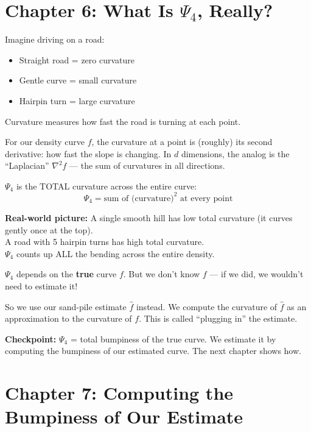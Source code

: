 \documentclass[12pt]{article}
\newcommand{\concept}[2]{\begin{tcolorbox}[colback=blue!3,colframe=blue!40!black,title={#1},breakable]#2\end{tcolorbox}}
\newcommand{\realworld}[1]{\begin{tcolorbox}[colback=green!5,colframe=green!50!black,breakable]\textbf{Real-world picture:} #1\end{tcolorbox}}
\newcommand{\checkpoint}[1]{\begin{tcolorbox}[colback=purple!5,colframe=purple!50!black,breakable]\textbf{Checkpoint:} #1\end{tcolorbox}}
\begin{document}
\section{Chapter 6: What Is $\Psi_4$, Really?}

\concept{Curvature: how much a curve bends}{
Imagine driving on a road:
\begin{itemize}
\item Straight road = zero curvature
\item Gentle curve = small curvature
\item Hairpin turn = large curvature
\end{itemize}

Curvature measures how fast the road is turning at each point.
}

For our density curve $f$, the curvature at a point is (roughly) its second derivative: how fast the slope is changing. In $d$ dimensions, the analog is the ``Laplacian'' $\nabla^2 f$ --- the sum of curvatures in all directions.

$\Psi_4$ is the TOTAL curvature across the entire curve:
$$\Psi_4 = \text{sum of (curvature)}^2 \text{ at every point}$$

\realworld{
A single smooth hill has low total curvature (it curves gently once at the top).\\
A road with 5 hairpin turns has high total curvature.\\
$\Psi_4$ counts up ALL the bending across the entire density.
}

\concept{Why we can't just calculate it}{
$\Psi_4$ depends on the \textbf{true} curve $f$. But we don't know $f$ --- if we did, we wouldn't need to estimate it! 

So we use our sand-pile estimate $\hat{f}$ instead. We compute the curvature of $\hat{f}$ as an approximation to the curvature of $f$. This is called ``plugging in'' the estimate.
}

\checkpoint{$\Psi_4$ = total bumpiness of the true curve. We estimate it by computing the bumpiness of our estimated curve. The next chapter shows how.}

\section{Chapter 7: Computing the Bumpiness of Our Estimate}
\end{document}
